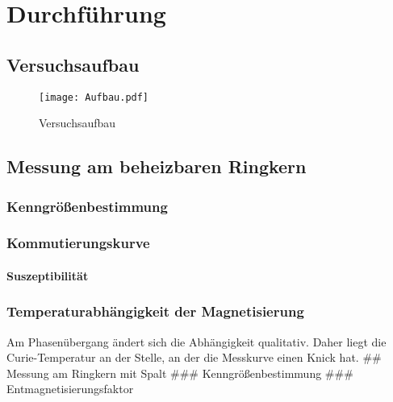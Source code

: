\documentclass[12pt,a4paper]{scrartcl}
\numberwithin{equation}{section} %
\renewcommand{\[}{} %
\renewcommand{\]}{\noindent} %
\begin{document}
\hypertarget{durchfuxfchrung}{%
\section{Durchführung}\label{durchfuxfchrung}}

\hypertarget{versuchsaufbau}{%
\subsection{Versuchsaufbau}\label{versuchsaufbau}}

\begin{figure}
\centering
\texttt{[image: Aufbau.pdf]}
\caption{Versuchsaufbau}
\end{figure}

\hypertarget{messung-am-beheizbaren-ringkern}{%
\subsection{Messung am beheizbaren
Ringkern}\label{messung-am-beheizbaren-ringkern}}

\hypertarget{kenngruxf6uxdfenbestimmung}{%
\subsubsection{Kenngrößenbestimmung}\label{kenngruxf6uxdfenbestimmung}}

\hypertarget{kommutierungskurve}{%
\subsubsection{Kommutierungskurve}\label{kommutierungskurve}}

\hypertarget{suszeptibilituxe4t}{%
\paragraph{Suszeptibilität}\label{suszeptibilituxe4t}}

\hypertarget{temperaturabhuxe4ngigkeit-der-magnetisierung}{%
\subsubsection{Temperaturabhängigkeit der
Magnetisierung}\label{temperaturabhuxe4ngigkeit-der-magnetisierung}}

Am Phasenübergang ändert sich die Abhängigkeit qualitativ. Daher liegt
die Curie-Temperatur an der Stelle, an der die Messkurve einen Knick
hat. \#\# Messung am Ringkern mit Spalt \#\#\# Kenngrößenbestimmung
\#\#\# Entmagnetisierungsfaktor
\end{document}
